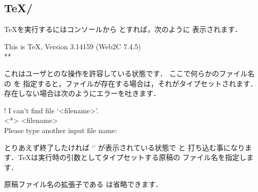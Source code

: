 %
%
%
%



\subsection{\TeX/\pTeX}
\TeX を実行するにはコンソールから  とすれば，次のように
表示されます．
\begin{OutTerm}
This is TeX, Version 3.14159 (Web2C 7.4.5)\\
**
\end{OutTerm}
これはユーザとのな操作を許容している状態です．
ここで何らかのファイル名  の  を
指定すると，ファイルが存在する場合は，それがタイプセットされます．
存在しない場合は次のようにエラーを吐きます．
\begin{OutTerm}
! I can't find file `<filename>'.\\
<*> <filename>\\
Please type another input file name: 
\end{OutTerm}
とりあえず終了したければ `\str{*}' が表示されている状態で  と
打ち込む事になります．\TeX は実行時の引数としてタイプセットする原稿の
ファイル名を指定します．
\begin{Syntax}
   
\end{Syntax}
原稿ファイル名の拡張子である  は省略できます．

